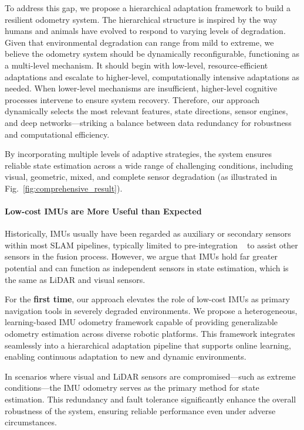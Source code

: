 To address this gap, we propose a hierarchical adaptation framework to build a resilient odometry system. The hierarchical structure is inspired by the way humans and animals have evolved to respond to varying levels of degradation. Given that environmental degradation can range from mild to extreme, we believe the odometry system should be dynamically reconfigurable, functioning as a multi-level mechanism. It should begin with low-level, resource-efficient adaptations and escalate to higher-level, computationally intensive adaptations as needed. When lower-level mechanisms are insufficient, higher-level cognitive processes intervene to ensure system recovery. Therefore, our approach dynamically selects the most relevant features, state directions, sensor engines, and deep networks—striking a balance between data redundancy for robustness and computational efficiency.

By incorporating multiple levels of adaptive strategies, the system ensures reliable state estimation across a wide range of challenging conditions, including visual, geometric, mixed, and complete sensor degradation (as illustrated in Fig.~\ref{fig:comprehensive_result}).

\paragraph{Low-cost IMUs are More Useful than Expected} Historically, IMUs usually have been regarded as auxiliary or secondary sensors within most SLAM pipelines, typically limited to pre-integration ~\cite{forster2015imu} to assist other sensors in the fusion process. However, we argue that IMUs hold far greater potential and can function as independent sensors in state estimation,  which is the same as LiDAR and visual sensors. 

 For the \textbf{first time}, our approach elevates the role of low-cost IMUs as primary navigation tools in severely degraded environments. We propose a heterogeneous, learning-based IMU odometry framework capable of providing generalizable odometry estimation across diverse robotic platforms. This framework integrates seamlessly into a hierarchical adaptation pipeline that supports online learning, enabling continuous adaptation to new and dynamic environments.
 
In scenarios where visual and LiDAR sensors are compromised—such as extreme conditions—the IMU odometry serves as the primary method for state estimation. This redundancy and fault tolerance significantly enhance the overall robustness of the system, ensuring reliable performance even under adverse circumstances.

